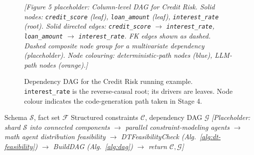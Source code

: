 \begin{figure}[t]
  \centering
  \vspace{1.5cm}
  \textit{[Figure 5 placeholder: Column-level DAG for Credit Risk.
  Solid nodes: \texttt{credit\_score} (leaf), \texttt{loan\_amount} (leaf),
  \texttt{interest\_rate} (root).
  Solid directed edges: \texttt{credit\_score} $\to$ \texttt{interest\_rate},
  \texttt{loan\_amount} $\to$ \texttt{interest\_rate}.
  FK edges shown as dashed.
  Dashed composite node group for a multivariate dependency (placeholder).
  Node colouring: deterministic-path nodes (blue), LLM-path nodes (orange).]}
  \vspace{1.5cm}
  \caption{Dependency DAG for the Credit Risk running example.
           \texttt{interest\_rate} is the reverse-causal root; its drivers are leaves.
           Node colour indicates the code-generation path taken in Stage 4.}
  \label{fig:dag}
\end{figure}

\begin{algorithm}[t]
\caption{Stage 3: Constraint Modeling}
\label{alg:stage3}
\begin{algorithmic}[1]
  \Require Schema $\mathcal{S}$, fact set $\mathcal{F}$
  \Ensure Structured constraints $\mathcal{C}$, dependency DAG $\mathcal{G}$
  \State \textit{[Placeholder: shard $\mathcal{S}$ into connected components
         $\to$ parallel constraint-modeling agents $\to$ math agent distribution feasibility
         $\to$ DTFeasibilityCheck (Alg.~\ref{alg:dt-feasibility})
         $\to$ BuildDAG (Alg.~\ref{alg:dag})
         $\to$ return $\mathcal{C}, \mathcal{G}$]}
\end{algorithmic}
\end{algorithm}

